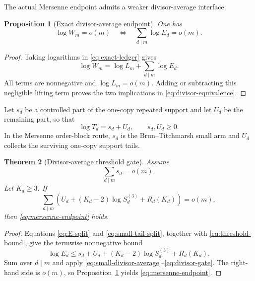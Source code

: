 \documentclass[11pt]{article}
\newtheorem{theorem}{Theorem}[section]
\newtheorem{proposition}[theorem]{Proposition}
\theoremstyle{remark}
\begin{document}
The actual Mersenne endpoint admits a weaker divisor-average interface.

\begin{proposition}[Exact divisor-average endpoint]
\label{prop:divisor-endpoint}
One has
\begin{equation}
 \log W_m=o(m)
 \quad\Longleftrightarrow\quad
 \sum_{d\mid m}\log E_d=o(m).
 \label{eq:divisor-equivalence}
\end{equation}
\end{proposition}

\begin{proof}
Taking logarithms in \eqref{eq:exact-ledger} gives
\[
 \log W_m=\log L_m+\sum_{d\mid m}\log E_d.
\]
All terms are nonnegative and $\log L_m=o(m)$.  Adding or subtracting this
negligible lifting term proves the two implications in
\eqref{eq:divisor-equivalence}.
\end{proof}

Let $s_d$ be a controlled part of the one-copy repeated support and let
$U_d$ be the remaining part, so that
\begin{equation}
                  \log T_d=s_d+U_d,
  \qquad s_d,U_d\ge0.
 \label{eq:small-tail-split}
\end{equation}
In the Mersenne order-block route, $s_d$ is the Brun--Titchmarsh small arm
and $U_d$ collects the surviving one-copy support tails.

\begin{theorem}[Divisor-average threshold gate]
\label{thm:divisor-gate}
Assume
\begin{equation}
                  \sum_{d\mid m}s_d=o(m).
 \label{eq:small-divisor-average}
\end{equation}
Let $K_d\ge3$.  If
\begin{equation}
 \sum_{d\mid m}\left(
   U_d+(K_d-2)\log S_d^{(3)}+R_d(K_d)
 \right)=o(m),
 \label{eq:divisor-gate}
\end{equation}
then \eqref{eq:mersenne-endpoint} holds.
\end{theorem}

\begin{proof}
Equations \eqref{eq:E-split} and \eqref{eq:small-tail-split}, together
with \eqref{eq:threshold-bound}, give the termwise nonnegative bound
\[
 \log E_d
 \le s_d+U_d+(K_d-2)\log S_d^{(3)}+R_d(K_d).
\]
Sum over $d\mid m$ and apply
\eqref{eq:small-divisor-average}--\eqref{eq:divisor-gate}.  The right-hand
side is $o(m)$, so Proposition~\ref{prop:divisor-endpoint} yields
\eqref{eq:mersenne-endpoint}.
\end{proof}
\end{document}
